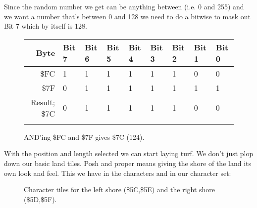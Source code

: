 %


Since the random number we get can be anything between  (i.e. 0 and 255) and we want a number
that's between 0 and 128 we need to do a bitwise  to mask out Bit 7 which by itself is 128.

\begin{figure}[H]
  {
    \setlength{\tabcolsep}{3.0pt}
    \setlength\cmidrulewidth{\heavyrulewidth} %
    \begin{adjustbox}{width=10cm,center}

      \begin{tabular}{rllllllll}
        \toprule
        Byte & Bit 7 & Bit 6 & Bit 5 & Bit 4 & Bit 3 & Bit 2 & Bit 1 & Bit 0        \\
        \midrule
        \$FC & 1 & 1 & 1 & 1 & 1 & 1 & 0 & 0 \\
        \$7F & 0 & 1 & 1 & 1 & 1 & 1 & 1 & 1 \\
        \midrule
        Result; \$7C & 0 & 1 & 1 & 1 & 1 & 1 & 0 & 0 \\
        \addlinespace
        \bottomrule
      \end{tabular}

    \end{adjustbox}

  }\caption*{AND'ing \$FC and \$7F gives \$7C (124).}
\end{figure}

With the position and length selected we can start laying turf. We don't just plop down our basic land tiles. Posh
and proper means giving the shore of the land its own look and feel. This we have in the characters  and
 in our character set: 

\begin{figure}[H]
{
  \setlength{\tabcolsep}{3.0pt}
  \setlength\cmidrulewidth{\heavyrulewidth} %
    \begin{adjustbox}{width=15cm,center}
  \begin{subfigure}{0.3\textwidth}
  
  \end{subfigure}
  \begin{subfigure}{0.3\textwidth}
  
  \end{subfigure}
  \begin{subfigure}{0.3\textwidth}
  
  \end{subfigure}
  \begin{subfigure}{0.3\textwidth}
  
  \end{subfigure}
  \end{adjustbox}
}\caption[]{Character tiles for the left shore (\$5C,\$5E) and the right shore (\$5D,\$5F).}
\end{figure}

